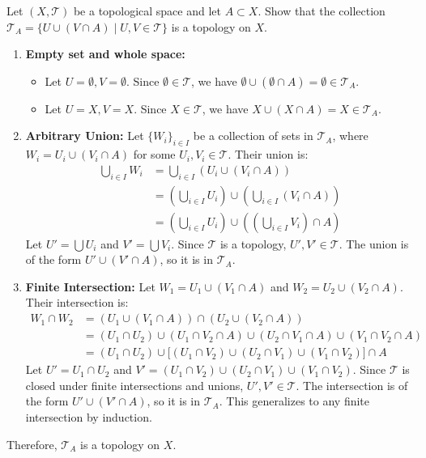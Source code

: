 \begin{problem}
  Let $(X, \mathcal{T})$ be a topological space and let $A \subset X$. Show that the collection $\mathcal{T}_A = \{U \cup (V \cap A) \mid U, V \in \mathcal{T}\}$ is a topology on $X$.
\end{problem}

\begin{solution}
  \begin{enumerate}
      \item \textbf{Empty set and whole space:}
      \begin{itemize}
          \item Let $U = \emptyset, V = \emptyset$. Since $\emptyset \in \mathcal{T}$, we have $\emptyset \cup (\emptyset \cap A) = \emptyset \in \mathcal{T}_A$.
          \item Let $U = X, V = X$. Since $X \in \mathcal{T}$, we have $X \cup (X \cap A) = X \in \mathcal{T}_A$.
      \end{itemize}

      \item \textbf{Arbitrary Union:} Let $\{W_i\}_{i \in I}$ be a collection of sets in $\mathcal{T}_A$, where $W_i = U_i \cup (V_i \cap A)$ for some $U_i, V_i \in \mathcal{T}$. Their union is:
      \begin{align*}
          \bigcup_{i \in I} W_i &= \bigcup_{i \in I} (U_i \cup (V_i \cap A)) \\
          &= \left(\bigcup_{i \in I} U_i\right) \cup \left(\bigcup_{i \in I} (V_i \cap A)\right) \\
          &= \left(\bigcup_{i \in I} U_i\right) \cup \left(\left(\bigcup_{i \in I} V_i\right) \cap A\right)
      \end{align*}
      Let $U' = \bigcup U_i$ and $V' = \bigcup V_i$. Since $\mathcal{T}$ is a topology, $U', V' \in \mathcal{T}$. The union is of the form $U' \cup (V' \cap A)$, so it is in $\mathcal{T}_A$.

      \item \textbf{Finite Intersection:} Let $W_1 = U_1 \cup (V_1 \cap A)$ and $W_2 = U_2 \cup (V_2 \cap A)$. Their intersection is:
      \begin{align*}
          W_1 \cap W_2 &= (U_1 \cup (V_1 \cap A)) \cap (U_2 \cup (V_2 \cap A)) \\
          &= (U_1 \cap U_2) \cup (U_1 \cap V_2 \cap A) \cup (U_2 \cap V_1 \cap A) \cup (V_1 \cap V_2 \cap A) \\
          &= (U_1 \cap U_2) \cup \Big[ (U_1 \cap V_2) \cup (U_2 \cap V_1) \cup (V_1 \cap V_2) \Big] \cap A
      \end{align*}
      Let $U' = U_1 \cap U_2$ and $V' = (U_1 \cap V_2) \cup (U_2 \cap V_1) \cup (V_1 \cap V_2)$. Since $\mathcal{T}$ is closed under finite intersections and unions, $U', V' \in \mathcal{T}$. The intersection is of the form $U' \cup (V' \cap A)$, so it is in $\mathcal{T}_A$. This generalizes to any finite intersection by induction.
  \end{enumerate}
  Therefore, $\mathcal{T}_A$ is a topology on $X$.
\end{solution}

